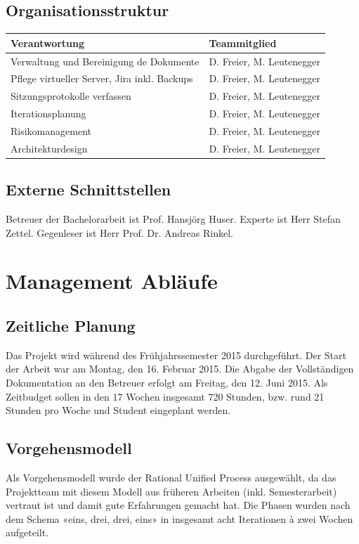 	\subsection*{Organisationsstruktur}
		\begin{tabularx}{\textwidth}{Xl}
			\textbf{Verantwortung}	& \textbf{Teammitglied} \\
			\hline
			Verwaltung und Bereinigung de Dokumente		& D. Freier, M. Leutenegger \\ \hline
			Pflege virtueller Server, Jira inkl. Backups	& D. Freier, M. Leutenegger \\ \hline
			Sitzungsprotokolle verfassen					& D. Freier, M. Leutenegger \\ \hline
			Iterationsplanung							& D. Freier, M. Leutenegger \\ \hline
			Risikomanagement								& D. Freier, M. Leutenegger \\ \hline
			Architekturdesign							& D. Freier, M. Leutenegger \\ \hline
		\end{tabularx}

	\subsection*{Externe Schnittstellen}
		Betreuer der Bachelorarbeit ist Prof. Hansjörg Huser. Experte ist Herr Stefan Zettel. Gegenleser ist Herr Prof. Dr. Andreas Rinkel.
\pagebreak

\section*{Management Abläufe}
	\subsection*{Zeitliche Planung}
		Das Projekt wird während des Frühjahrssemester 2015 durchgeführt. Der Start der Arbeit war am Montag, 
		den 16. Februar 2015. Die Abgabe der Vollständigen Dokumentation an den Betreuer erfolgt am Freitag, 
		den 12. Juni 2015. Als Zeitbudget sollen in den 17 Wochen insgesamt 720 Stunden, bzw. rund 21 Stunden 
		pro Woche und Student eingeplant werden.

	\subsection*{Vorgehensmodell}
		Als Vorgehensmodell wurde der Rational Unified Process ausgewählt, da das Projektteam mit diesem Modell 
		aus früheren Arbeiten (inkl. Semesterarbeit) vertraut ist und damit gute Erfahrungen gemacht hat. Die 
		Phasen wurden nach dem Schema «eins, drei, drei, eins» in insgesamt acht Iterationen à zwei Wochen aufgeteilt.

